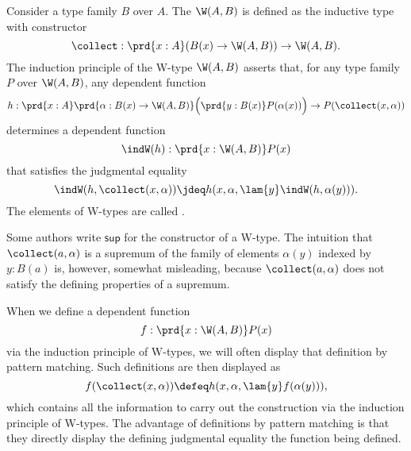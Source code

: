 \begin{defn}
  Consider a type family $B$ over $A$. The  $\W(A,B)$ is defined as the inductive type with constructor
  \begin{equation*}
    \collect : \prd{x:A} (B(x)\to \W(A,B))\to \W(A,B).
  \end{equation*}
  The induction principle of the W-type $\W(A,B)$ asserts that, for any type family $P$ over $\W(A,B)$, any dependent function
  \begin{equation*}
    h : \prd{x:A}\prd{\alpha:B(x)\to \W(A,B)} \Big(\prd{y:B(x)}P(\alpha(x))\Big)\to P(\collect(x,\alpha))
  \end{equation*}
  determines a dependent function
  \begin{equation*}
    \indW(h):\prd{x:\W(A,B)}P(x)
  \end{equation*}
  that satisfies the judgmental equality
  \begin{equation*}
    \indW(h,\collect(x,\alpha))\jdeq h(x,\alpha,\lam{y}\indW(h,\alpha(y))).
  \end{equation*}
  The elements of W-types are called .
\end{defn}

\begin{rmk}
  Some authors write $\mathsf{sup}$ for the constructor of a W-type. The intuition that $\collect(a,\alpha)$ is a supremum of the family of elements $\alpha(y)$ indexed by $y:B(a)$ is, however, somewhat misleading, because $\collect(a,\alpha)$ does not satisfy the defining properties of a supremum.
\end{rmk}

\begin{rmk}
  When we define a dependent function
  \begin{equation*}
    f:\prd{x:\W(A,B)}P(x)
  \end{equation*}
  via the induction principle of W-types, we will often display that definition by pattern matching. Such definitions are then displayed as
  \begin{equation*}
    f(\collect(x,\alpha))\defeq h(x,\alpha,\lam{y}f(\alpha(y))),
  \end{equation*}
  which contains all the information to carry out the construction via the induction principle of W-types. The advantage of definitions by pattern matching is that they directly display the defining judgmental equality the function being defined.
\end{rmk}

